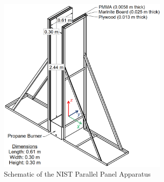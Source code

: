 \documentclass[12pt]{article}
\begin{document}
\begin{figure}
     \centering
         \includegraphics[width=0.75\textwidth]{../../Fire_Growth/NIST_Parallel_Panel/Documentation/Panel_Assembly.png}
         \caption{Schematic of the NIST Parallel Panel Apparatus}
         \label{fig:Panel_Schematic}
\end{figure}
\end{document}
